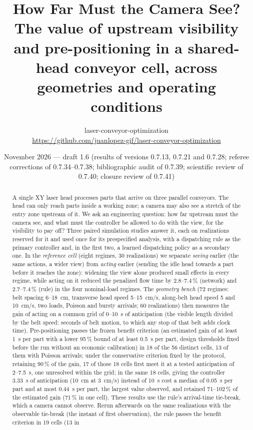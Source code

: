 \documentclass[11pt,a4paper]{article}
\title{\textbf{How Far Must the Camera See?}\\[0.3em]
\large The value of upstream visibility and pre-positioning in a shared-head conveyor cell,
across geometries and operating conditions}
\author{laser-conveyor-optimization\\\small\url{https://github.com/juanlopez-gif/laser-conveyor-optimization}}
\date{November 2026 --- draft 1.6 (results of versions 0.7.13, 0.7.21 and 0.7.28; referee corrections of 0.7.34--0.7.38; bibliographic audit of 0.7.39; scientific review of 0.7.40; closure review of 0.7.41)}
\begin{document}
\maketitle

\begin{abstract}
A single XY laser head processes parts that arrive on three parallel conveyors. The head
can only reach parts inside a working zone; a camera may also see a stretch of the entry
zone upstream of it. We ask an engineering question: how far upstream must the camera see,
and what must the controller be allowed to do with the view, for the visibility to pay
off? Three paired simulation studies answer it, each on realizations reserved for it and
used once for its prespecified analysis, with a dispatching rule as the primary controller and, in the first two, a
learned dispatching policy as a secondary one. In the \emph{reference cell} (eight regimes, 30 realizations)
we separate \emph{seeing} earlier (the same actions, a wider view) from \emph{acting}
earlier (sending the idle head towards a part before it reaches the zone): widening the
view alone produced small effects in every regime, while acting on it reduced the
penalized flow time by 2.8--7.4\,\% (network) and 2.7--7.4\,\% (rule) in the four nominal-load regimes. The \emph{geometry
bench} (72 regimes: belt spacing 6--18~cm, transverse head speed 5--15~cm/s, along-belt
head speed 5 and 10~cm/s, two loads, Poisson and bursty arrivals; 60 realizations) then
measures the gain of acting on a common grid of 0--10~s of anticipation (the visible
length divided by the belt speed: seconds of belt motion, to which any stop of that belt
adds clock time). Pre-positioning
passes the frozen benefit criterion (an estimated gain of at least 1~s per part with a
lower 95\,\% bound of at least 0.5~s per part, design thresholds fixed before the run
without an economic calibration) in 18 of the 56 distinct cells, 13 of them
with Poisson arrivals; under the conservative criterion fixed by the protocol, retaining 90\,\% of the gain,
17 of those 18 cells first meet it at a tested anticipation of 2--7.5~s, one unresolved
within the grid; in the same 18 cells, giving the controller 3.33~s of anticipation (10~cm at
3~cm/s) instead of 10~s cost a median of 0.05~s per part and at most 0.44~s per part,
the largest value observed, and retained 71--102\,\% of the estimated gain (71\,\% in
one cell). These results use the rule's arrival-time tie-break, which a camera cannot
observe. Rerun afterwards on the same realizations with the observable tie-break (the
instant of first observation), the rule passes the benefit criterion in 19 cells (13 in

\end{abstract}
\end{document}
